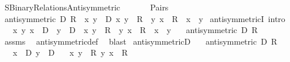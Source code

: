 %
\begin{isabellebody}%
%
%
\isadelimdocument
%
\endisadelimdocument
%
\isatagdocument
%
\isamarkuptrue%
%
\endisatagdocument
{\isafolddocument}%
%
\isadelimdocument
%
\endisadelimdocument
%
\isadelimtheory
%
\endisadelimtheory
%
\isatagtheory
{}\isamarkupfalse%
\ SBinary{\isacharunderscore}{\kern0pt}Relations{\isacharunderscore}{\kern0pt}Antisymmetric\isanewline
\ \ \isanewline
\ \ \ \ Pairs\isanewline
{}%
\endisatagtheory
{\isafoldtheory}%
%
\isadelimtheory
\isanewline
%
\endisadelimtheory
\isanewline
{}\isamarkupfalse%
\ {\isachardoublequoteopen}antisymmetric\ D\ R\ {\isasymequiv}\ {\isasymforall}x\ y\ {\isasymin}\ D{\isachardot}{\kern0pt}\ {\isasymlangle}x{\isacharcomma}{\kern0pt}\ y{\isasymrangle}\ {\isasymin}\ R\ {\isasymand}\ {\isasymlangle}y{\isacharcomma}{\kern0pt}\ x{\isasymrangle}\ {\isasymin}\ R\ {\isasymlongrightarrow}\ x\ {\isacharequal}{\kern0pt}\ y{\isachardoublequoteclose}\isanewline
\isanewline
{}\isamarkupfalse%
\ antisymmetricI\ {\isacharbrackleft}{\kern0pt}intro{\isacharbrackright}{\kern0pt}{\isacharcolon}{\kern0pt}\isanewline
\ \ \ {\isachardoublequoteopen}{\isasymAnd}x\ y{\isachardot}{\kern0pt}\ x\ {\isasymin}\ D\ {\isasymLongrightarrow}\ y\ {\isasymin}\ D\ {\isasymLongrightarrow}\ {\isasymlangle}x{\isacharcomma}{\kern0pt}\ y{\isasymrangle}\ {\isasymin}\ R\ {\isasymLongrightarrow}\ {\isasymlangle}y{\isacharcomma}{\kern0pt}\ x{\isasymrangle}\ {\isasymin}\ R\ {\isasymLongrightarrow}\ x\ {\isacharequal}{\kern0pt}\ y{\isachardoublequoteclose}\isanewline
\ \ \ {\isachardoublequoteopen}antisymmetric\ D\ R{\isachardoublequoteclose}\isanewline
%
\isadelimproof
\ \ %
\endisadelimproof
%
\isatagproof
{}\isamarkupfalse%
\ assms\ \isamarkupfalse%
\ antisymmetric{\isacharunderscore}{\kern0pt}def\ \isamarkupfalse%
\ blast%
\endisatagproof
{\isafoldproof}%
%
\isadelimproof
\isanewline
%
\endisadelimproof
\isanewline
{}\isamarkupfalse%
\ antisymmetricD{\isacharcolon}{\kern0pt}\isanewline
\ \ \ {\isachardoublequoteopen}antisymmetric\ D\ R{\isachardoublequoteclose}\isanewline
\ \ \ {\isachardoublequoteopen}x\ {\isasymin}\ D{\isachardoublequoteclose}\ {\isachardoublequoteopen}y\ {\isasymin}\ D{\isachardoublequoteclose}\isanewline
\ \ \ {\isachardoublequoteopen}{\isasymlangle}x{\isacharcomma}{\kern0pt}\ y{\isasymrangle}\ {\isasymin}\ R{\isachardoublequoteclose}\ {\isachardoublequoteopen}{\isasymlangle}y{\isacharcomma}{\kern0pt}\ x{\isasymrangle}\ {\isasymin}\ R{\isachardoublequoteclose}\isanewline

\end{isabellebody}
